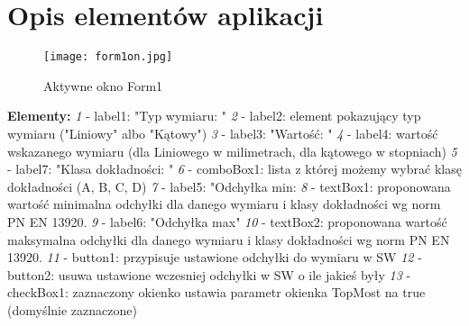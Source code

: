 \documentclass[11pt,a4paper]{article}
\begin{document}
\newpage
\section{Opis elementów aplikacji}
\begin{figure}[h!]
\centering
\texttt{[image: form1on.jpg]}
\caption{Aktywne okno Form1}
\end{figure}
\textbf{Elementy: }
\newline
\newline
\textit{1} - label1: "Typ wymiaru: "
\newline
\newline
\textit{2} - label2: element pokazujący typ wymiaru ("Liniowy" albo "Kątowy")
\newline
\newline
\textit{3} - label3: "Wartość: "
\newline
\newline
\textit{4} - label4: wartość wskazanego wymiaru (dla Liniowego w milimetrach, dla kątowego w stopniach)
\newline
\newline
\textit{5} - label7: "Klasa dokładności: "
\newline 
\newline
\textit{6} - comboBox1: lista z której możemy wybrać klasę dokładności (A, B, C, D)
\newline
\newline
\textit{7} - label5: "Odchyłka min:
\newline
\newline
\textit{8} - textBox1: proponowana wartość minimalna odchyłki dla danego wymiaru i klasy dokładności wg norm PN EN 13920.
\newline
\newline
\textit{9} - label6: "Odchyłka max" 
\newline
\newline
\textit{10} - textBox2: proponowana wartość maksymalna odchyłki dla danego wymiaru i klasy dokładności wg norm PN EN 13920.
\newline
\newline
\textit{11} - button1: przypisuje ustawione odchyłki do wymiaru w SW
\newline
\newline
\textit{12} - button2: usuwa ustawione wczesniej odchyłki w SW o ile jakieś były
\newline
\newline
\textit{13} - checkBox1: zaznaczony okienko ustawia parametr okienka TopMost na true (domyślnie zaznaczone)
\end{document}
